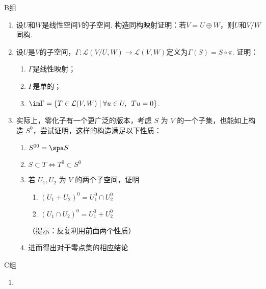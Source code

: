 \centerline{\heiti B组}
\begin{enumerate}
    \item 设$U$和$W$是线性空间$V$的子空间. 构造同构映射证明：若$V=U\oplus W$，则$U$和$V/W$同构.

    \item 设$U$是$V$的子空间，$\Gamma:\mathcal{L}(V/U,W)\to \mathcal{L}(V,W)$定义为$\Gamma(S)=S\circ\pi$. 证明：
          \begin{enumerate}
              \item $\Gamma$是线性映射；

              \item $\Gamma$是单的；

              \item $\im\Gamma=\{T\in \mathcal{L}(V,W) \mid \forall u\in U,\enspace Tu=0\}$.
          \end{enumerate}

    \item 实际上，零化子有一个更广泛的版本，考虑 $S$ 为 $V$ 的一个子集，也能如上构造 $S^0$，尝试证明，这样的构造满足以下性质：
          \begin{enumerate}
              \item $S^{00} = \spa S$
              \item $S \subset T \iff T^0 \subset S^0$
              \item 若 $U_1, U_2$ 为 $V$ 的两个子空间，证明 \begin{enumerate}
                        \item $(U_1 + U_2)^0 = U_1^0 \cap U_2^0$
                        \item $(U_1 \cap U_2)^0 = U_1^0 + U_2^0$
                    \end{enumerate}（提示：反复利用前面两个性质）
              \item 进而得出对于零点集的相应结论
          \end{enumerate}
\end{enumerate}

\centerline{\heiti C组}
\begin{enumerate}
    \item
\end{enumerate}
